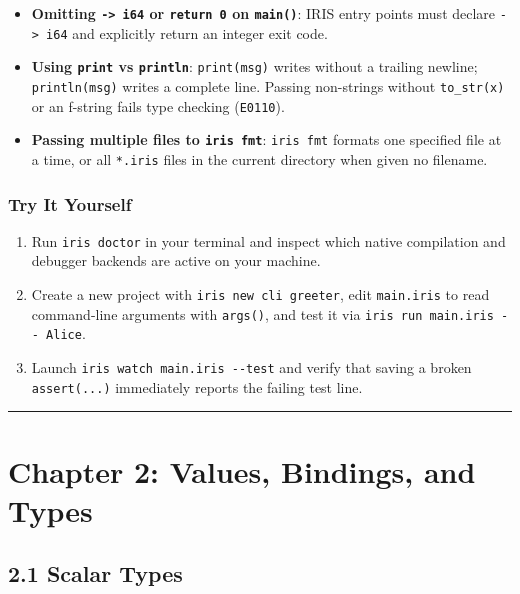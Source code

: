\documentclass[
  english,
  oneside]{book}
\providecommand{\tightlist}{%
  \setlength{\itemsep}{0pt}\setlength{\parskip}{0pt}}
\begin{document}
\begin{itemize}
\tightlist
\item
  \textbf{Omitting \texttt{-\textgreater{}\ i64} or \texttt{return\ 0}
  on \texttt{main()}}: IRIS entry points must declare
  \texttt{-\textgreater{}\ i64} and explicitly return an integer exit
  code.
\item
  \textbf{Using \texttt{print} vs \texttt{println}}: \texttt{print(msg)}
  writes without a trailing newline; \texttt{println(msg)} writes a
  complete line. Passing non-strings without \texttt{to\_str(x)} or an
  f-string fails type checking (\texttt{E0110}).
\item
  \textbf{Passing multiple files to \texttt{iris\ fmt}}:
  \texttt{iris\ fmt} formats one specified file at a time, or all
  \texttt{*.iris} files in the current directory when given no filename.
\end{itemize}

\subsection{Try It Yourself}\label{try-it-yourself}

\begin{enumerate}
\def\labelenumi{\arabic{enumi}.}
\tightlist
\item
  Run \texttt{iris\ doctor} in your terminal and inspect which native
  compilation and debugger backends are active on your machine.
\item
  Create a new project with \texttt{iris\ new\ cli\ greeter}, edit
  \texttt{main.iris} to read command-line arguments with
  \texttt{args()}, and test it via
  \texttt{iris\ run\ main.iris\ -\/-\ Alice}.
\item
  Launch \texttt{iris\ watch\ main.iris\ -\/-test} and verify that
  saving a broken \texttt{assert(...)} immediately reports the failing
  test line.
\end{enumerate}

\begin{center}\rule{0.5\linewidth}{0.5pt}\end{center}

\chapter{Chapter 2: Values, Bindings, and
Types}\label{chapter-2-values-bindings-and-types}

\section{2.1 Scalar Types}\label{scalar-types}
\end{document}
